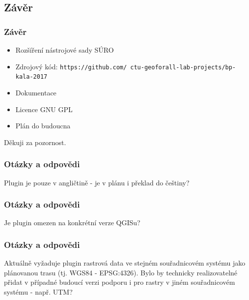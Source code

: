 \documentclass{beamer}
\begin{document}
\begin{frame}
\section{Závěr}
\frametitle{Závěr}
\begin{itemize}
	\item Rozšíření nástrojové sady SÚRO
	\item Zdrojový kód: \texttt{https://github.com/ ctu-geoforall-lab-projects/bp-kala-2017}
	\item Dokumentace 
	\item Licence GNU GPL
	\item Plán do budoucna
	


\end{itemize}
\end{frame}

\begin{frame}
\Huge{\centerline{Děkuji za pozornost.}}


\end{frame}

\begin{frame}
\frametitle{Otázky a odpovědi}
Plugin je pouze v angličtině - je v plánu i překlad do češtiny?
\begin{itemize}
\end{itemize}

\end{frame}

\begin{frame}
\frametitle{Otázky a odpovědi}
Je plugin omezen na konkrétní verze QGISu?
\end{frame}

\begin{frame}
\frametitle{Otázky a odpovědi}
Aktuálně vyžaduje plugin rastrová data ve stejném souřadnicovém systému jako plánovanou trasu (tj. WGS84 - EPSG:4326). Bylo by technicky realizovatelné přidat v případné budoucí verzi podporu i pro rastry v jiném souřadnicovém systému - např. UTM?
\end{frame}
\end{document}
